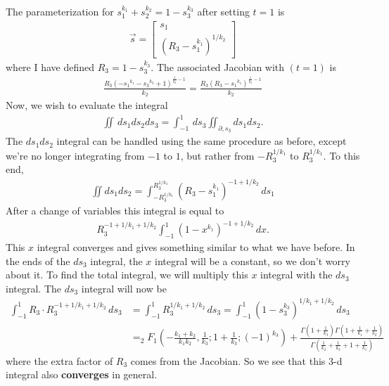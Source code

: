 \documentclass{article}
\theoremstyle{definition}
\newcommand{\p}{\partial}
\newcommand{\nn}{\nonumber}
\newcommand{\f}[2]{\frac{#1}{#2}}
\newcommand{\lp}{\left(}
\newcommand{\rp}{\right)}
\begin{document}
The parameterization for $s_1^{k_1} + s_2^{k_2} = 1- s_3^{k_3}$ after setting $t=1$ is 
\begin{align}
\vec{s} = \begin{bmatrix}
s_1 \\ (R_3 - s_1^{k_1})^{1/k_2}
\end{bmatrix}
\end{align}
where I have defined $R_3 = 1 - s_3^{k_3}$. The associated Jacobian with $(t=1)$ is
\begin{align}
{\frac{R_3 
		\left(-{s_1}^{{k_1}}-{s_3}^{{k_3}}+1\right)^{\frac{1}{{k_2}}-1}}{{k_2}}} = {\frac{R_3 
		\left(R_3-{s_1}^{{k_1}}\right)^{\frac{1}{{k_2}}-1}}{{k_2}}}
\end{align}
Now, we wish to evaluate the integral
\begin{align}
\iint \,ds_1ds_2ds_3 = \int_{-1}^1\,ds_3 \iint_{\p,s_3} ds_1ds_2.
\end{align}
The $ds_1ds_2$ integral can be handled using the same procedure as before, except we're no longer integrating from $-1$ to $1$, but rather from $-R_3^{1/k_1}$ to $R_3^{1/k_1}$. To this end,
\begin{align}
\iint ds_1ds_2 = \int_{-R_3^{1/k_1}}^{R_3^{1/k_1}} \lp R_3 - s_1^{k_1}\rp^{-1+1/k_2}\,ds_1
\end{align}
After a change of variables this integral is equal to
\begin{align}
R_3^{-1+1/k_1+1/k_2}\int^1_{-1}(1-x^{k_1})^{-1+1/k_2}\,dx.
\end{align}
This $x$ integral converges and gives something similar to what we have before. In the ends of the $ds_3$ integral, the $x$ integral will be a constant, so we don't worry about it. To find the total integral, we will multiply this $x$ integral with the $ds_3$ integral. The $ds_3$ integral will now be
\begin{align}
\int^1_{-1}R_3\cdot R_3^{-1+1/k_1+1/k_2}\,ds_3 &= \int^1_{-1} R_3^{1/k_1+1/k_2}\,ds_3 = \int^1_{-1} \lp 1- s_3^{k_3} \rp^{1/k_1+1/k_2}\,ds_3 \nn\\
&= _2F_1\left(-\frac{{k_1}+{k_2}}{{k_1}
	{k_2}},\frac{1}{{k_3}};1+\frac{1}{{k_3}};(-1)^{{k_3}}\right)+\frac{\Gamma
	\left(1+\frac{1}{{k_3}}\right) \Gamma
	\left(1+\frac{1}{{k_1}} + \f{1}{k_2}\right)}{\Gamma
	\left(\frac{1}{{k_2}}+\frac{1}{{k_3}}+1+\frac{1}{{k_1}}\right)}
\end{align}
where the extra factor of $R_3$ comes from the Jacobian. So we see that this 3-d integral also \textbf{converges} in general. \\
\end{document}
